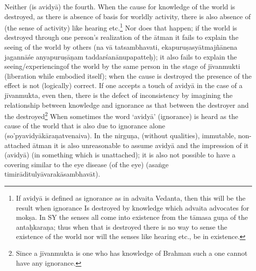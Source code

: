 Neither (is avidyā) the fourth. When the cause for knowledge of the world is destroyed, as there is absence of basis for worldly activity, there is also absence of (the sense of activity) like hearing etc.\footnote{If avidyā is defined as ignorance as in advaita Vedanta, then this will be the result when ignorance Is destroyed by knowledge which advaita advocates for mokṣa. In SY the senses all come into existence from the tāmasa guṇa of the antaḥkaraṇa; thus when that is destroyed there is no way to sense the existence of the world nor will the senses like hearing etc., be in existence.} Nor does that happen; if the world is destroyed through one person’s realization of the ātman it fails to explain the seeing of the world by others (na vā tatsambhavati, ekapuruṣasyātmajñānena jagannāśe anyapuruṣāṇam taddarśanānupapatteḥ); it also fails to explain the seeing/experiencingof the world by the same person in the stage of jīvanmukti (liberation while embodied itself); when the cause is destroyed the presence of the effect is not (logically) correct. If one accepts a touch of avidyā in the case of a jīvanmukta, even then, there is the defect of inconsistency by imagining the relationship between knowledge and ignorance as that between the destroyer and the destroyed\footnote{Since a jīvanmukta is one who has knowledge of Brahman such a one cannot have any ignorance.} When sometimes the word ‘avidyā’ (ignorance) is heard as the cause of the world that is also due to ignorance alone (so’pyavidyākāraṇatvenaiva). In the nirguṇa, (without qualities), immutable, non-attached ātman it is also unreasonable to assume avidyā and the impression of it (avidyā) (in something which is unattached); it is also not possible to have a covering similar to the eye disease (of the eye) (asaṅge timirāditulyāvarakāsambhavāt). 

